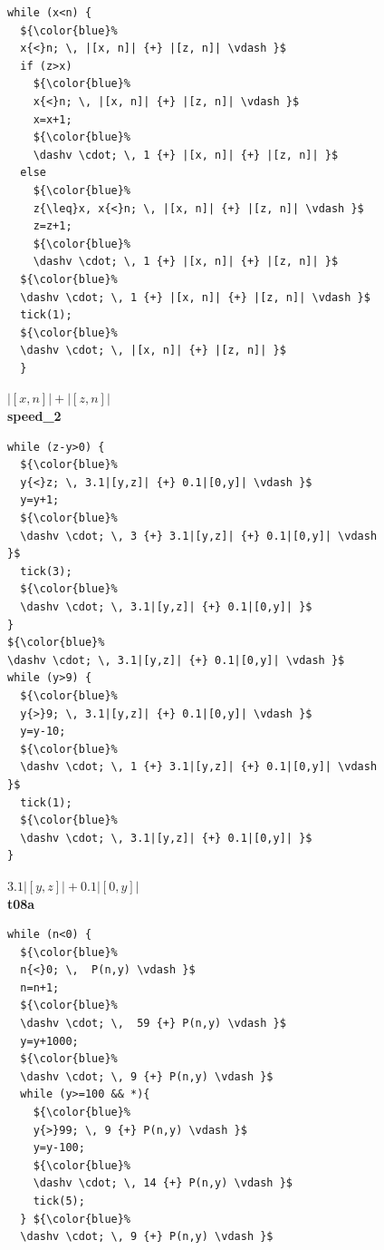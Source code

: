 \documentclass[nocopyrightspace,preprint,pldi]{sigplanconf-pldi15}
\begin{document}
\begin{figure}
\begin{minipage}[b]{\progwidth}
\begin{center}
\begin{lstlisting}
while (x<n) {
  ${\color{blue}%
  x{<}n; \, |[x, n]| {+} |[z, n]| \vdash }$
  if (z>x)
    ${\color{blue}%
    x{<}n; \, |[x, n]| {+} |[z, n]| \vdash }$
    x=x+1;
    ${\color{blue}%
    \dashv \cdot; \, 1 {+} |[x, n]| {+} |[z, n]| }$
  else
    ${\color{blue}%
    z{\leq}x, x{<}n; \, |[x, n]| {+} |[z, n]| \vdash }$
    z=z+1;
    ${\color{blue}%
    \dashv \cdot; \, 1 {+} |[x, n]| {+} |[z, n]| }$
  ${\color{blue}%
  \dashv \cdot; \, 1 {+} |[x, n]| {+} |[z, n]| \vdash }$
  tick(1);
  ${\color{blue}%
  \dashv \cdot; \, |[x, n]| {+} |[z, n]| }$
  }
   \end{lstlisting}
\vspace{-2.5ex}
$|[x, n]| + |[z, n]|$
\\[.4\baselineskip]
      {\bf speed\_2}
    \end{center}
  \end{minipage}
%
\hfill
%
  \begin{minipage}[b]{\progwidth}
    \begin{center}
   \begin{lstlisting}
while (z-y>0) {
  ${\color{blue}%
  y{<}z; \, 3.1|[y,z]| {+} 0.1|[0,y]| \vdash }$
  y=y+1;
  ${\color{blue}%
  \dashv \cdot; \, 3 {+} 3.1|[y,z]| {+} 0.1|[0,y]| \vdash }$
  tick(3);
  ${\color{blue}%
  \dashv \cdot; \, 3.1|[y,z]| {+} 0.1|[0,y]| }$
}
${\color{blue}%
\dashv \cdot; \, 3.1|[y,z]| {+} 0.1|[0,y]| \vdash }$
while (y>9) {
  ${\color{blue}%
  y{>}9; \, 3.1|[y,z]| {+} 0.1|[0,y]| \vdash }$
  y=y-10;
  ${\color{blue}%
  \dashv \cdot; \, 1 {+} 3.1|[y,z]| {+} 0.1|[0,y]| \vdash }$
  tick(1);
  ${\color{blue}%
  \dashv \cdot; \, 3.1|[y,z]| {+} 0.1|[0,y]| }$
}
   \end{lstlisting}
\vspace{-2.5ex}
$3.1|[y,z]| + 0.1|[0,y]|$
\\[.4\baselineskip]
      {\bf t08a}
    \end{center}
  \end{minipage}
%
\hfill
%
%
%
  \begin{minipage}[b]{\progwidth}
    \begin{center}
   \begin{lstlisting}
while (n<0) {
  ${\color{blue}%
  n{<}0; \,  P(n,y) \vdash }$
  n=n+1;
  ${\color{blue}%
  \dashv \cdot; \,  59 {+} P(n,y) \vdash }$
  y=y+1000;
  ${\color{blue}%
  \dashv \cdot; \, 9 {+} P(n,y) \vdash }$
  while (y>=100 && *){
    ${\color{blue}%
    y{>}99; \, 9 {+} P(n,y) \vdash }$
    y=y-100;
    ${\color{blue}%
    \dashv \cdot; \, 14 {+} P(n,y) \vdash }$
    tick(5);
  } ${\color{blue}%
  \dashv \cdot; \, 9 {+} P(n,y) \vdash }$

\end{lstlisting}
\end{center}
\end{minipage}
\end{figure}
\end{document}
